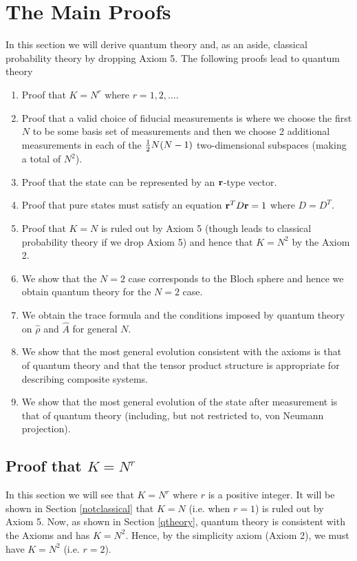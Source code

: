 \documentclass[10pt,twocolumn]{article}
\begin{document}
\section{The Main Proofs}

In this section we will derive quantum theory and, as an aside,
classical probability theory by dropping Axiom 5.
The following proofs lead to quantum theory

\begin{enumerate}
\item Proof that $K=N^r$ where $r=1,2,\dots$.
\item Proof that a valid choice of fiducial measurements is where we
choose the first $N$ to be some basis set of measurements and then we
choose 2 additional measurements in each of
the ${1\over2}N(N-1)$ two-dimensional subspaces (making a total of
$N^2$).
\item Proof that the state can be represented by an ${\bf r}$-type
vector.
\item Proof that pure states must satisfy an equation ${\bf r}^T D{\bf
r}=1$ where $D=D^T$.
\item Proof that $K=N$ is ruled out by Axiom 5 (though
leads to classical probability theory if we drop Axiom 5) and hence that
$K=N^2$ by the Axiom 2.
\item We show that the $N=2$ case corresponds to the Bloch sphere and
hence we obtain quantum theory for the $N=2$ case.
\item We obtain the trace formula and the conditions imposed by quantum
theory on $\hat{\rho}$ and $\hat{A}$ for general $N$.
\item We show that the most general evolution consistent with the axioms
is that of quantum theory and that the tensor product structure is
appropriate for describing composite systems.
\item We show that the most general evolution of the state after
measurement is that of quantum theory (including, but not restricted to,
von Neumann projection).
\end{enumerate}

\subsection{Proof that $K=N^r$}\label{secKNr}

In this section we will see that $K=N^r$ where $r$ is a positive
integer.  It will be shown in Section \ref{notclassical} that $K=N$
(i.e. when $r=1$) is ruled out by Axiom 5. Now, as shown in Section
\ref{qtheory}, quantum theory is consistent with the Axioms and has
$K=N^2$.  Hence, by the simplicity axiom (Axiom 2), we must have $K=N^2$
(i.e. $r=2$).
\end{document}
